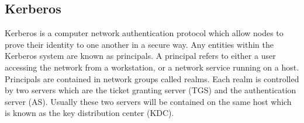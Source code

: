 \documentclass[]{report}   %
\begin{document}
\subsection{Kerberos}
Kerberos \cite{Kerb} is a computer network authentication protocol which allow nodes to prove their identity to one another in a secure way. Any entities within the Kerberos system are known as principals. A principal refers to either a user accessing the network from a workstation, or a network service running on a host. Principals are contained in network groups called realms. Each realm is controlled by two servers which are the ticket granting server (TGS) and the authentication server (AS). Usually these two servers will be contained on the same host which is known as the key distribution center (KDC).
\end{document}
